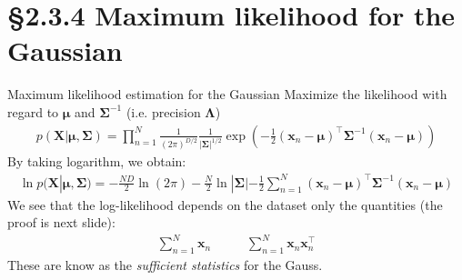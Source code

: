 \documentclass[10pt]{beamer}
\begin{document}
    \section{\S2.3.4 Maximum likelihood for the Gaussian}

    \begin{frame}{Maximum likelihood estimation for the Gaussian}
        Maximize the likelihood with regard to $\bm\mu$ and $\bm\Sigma^{-1}$ (i.e. precision $\bm\Lambda$)
        \begin{align*}
            p(\mathbf X | \bm\mu, \bm\Sigma) = \prod_{n=1}^N
            \frac{1}{(2\pi)^{D/2}}\frac{1}{|\bm\Sigma|^{1/2}}
            \exp\left( -\frac{1}{2}(\mathbf x_n - \bm\mu)^\top\bm\Sigma^{-1}(\mathbf x_n - \bm\mu) \right)
        \end{align*}
        By taking logarithm, we obtain:
        \begin{align*}
            \ln p(\mathbf X | \bm\mu, \bm\Sigma) = 
            -\frac{ND}{2}\ln(2\pi) - \frac{N}{2}\ln |\bm\Sigma|
            -\frac{1}{2}\sum_{n=1}^N (\mathbf x_n - \bm\mu)^\top\bm\Sigma^{-1}(\mathbf x_n - \bm\mu)
            \tag{2.118}
        \end{align*}
        We see that the log-likelihood depends on the dataset only the quantities (the proof is next slide):
        \begin{align*}
            \sum_{n=1}^{N} \mathbf x_n \;\;\;\;\;\;\;\;\;\;
            \sum_{n=1}^{N} \mathbf x_n\mathbf x_n^\top
            \tag{2.119}
        \end{align*}
        These are know as the \textit{sufficient statistics} for  the Gauss.

    \end{frame}
\end{document}
